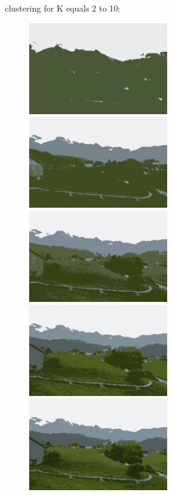 clustering for K equals 2 to 10:\\
\begin{center}
\begin{figure}[H]
\centering\includegraphics[width=6cm]{./imgkmeanscluster02-02.png}
\centering\includegraphics[width=6cm]{./imgkmeanscluster02-03.png}\\
\centering\includegraphics[width=6cm]{./imgkmeanscluster02-04.png}
\centering\includegraphics[width=6cm]{./imgkmeanscluster02-05.png}\\
\centering\includegraphics[width=6cm]{./imgkmeanscluster02-06.png}

\end{figure}
\end{center}

